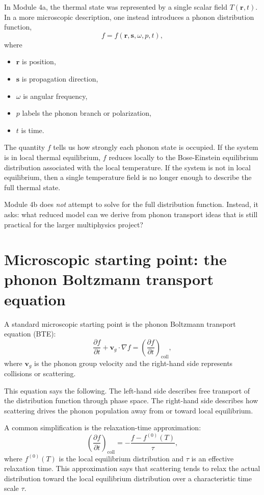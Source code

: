 \documentclass[11pt]{article}
\newcommand{\vvg}{\mathbf{v}_g}
\newcommand{\rvec}{\mathbf{r}}
\begin{document}
In Module 4a, the thermal state was represented by a single scalar field $T(\rvec,t)$. In a more microscopic description, one instead introduces a phonon distribution function,
\begin{equation}
 f = f(\rvec,\mathbf{s},\omega,p,t),
\end{equation}
where
\begin{itemize}
    \item $\rvec$ is position,
    \item $\mathbf{s}$ is propagation direction,
    \item $\omega$ is angular frequency,
    \item $p$ labels the phonon branch or polarization,
    \item $t$ is time.
\end{itemize}

The quantity $f$ tells us how strongly each phonon state is occupied. If the system is in local thermal equilibrium, $f$ reduces locally to the Bose-Einstein equilibrium distribution associated with the local temperature. If the system is not in local equilibrium, then a single temperature field is no longer enough to describe the full thermal state.

Module 4b does \emph{not} attempt to solve for the full distribution function. Instead, it asks: what reduced model can we derive from phonon transport ideas that is still practical for the larger multiphysics project?

\section{Microscopic starting point: the phonon Boltzmann transport equation}

A standard microscopic starting point is the phonon Boltzmann transport equation (BTE):
\begin{equation}
\frac{\partial f}{\partial t} + \vvg\cdot \nabla f = \left(\frac{\partial f}{\partial t}\right)_{\!\mathrm{coll}},
\end{equation}
where $\vvg$ is the phonon group velocity and the right-hand side represents collisions or scattering.

This equation says the following. The left-hand side describes free transport of the distribution function through phase space. The right-hand side describes how scattering drives the phonon population away from or toward local equilibrium.

A common simplification is the relaxation-time approximation:
\begin{equation}
\left(\frac{\partial f}{\partial t}\right)_{\!\mathrm{coll}} = -\frac{f-f^{(0)}(T)}{\tau},
\end{equation}
where $f^{(0)}(T)$ is the local equilibrium distribution and $\tau$ is an effective relaxation time. This approximation says that scattering tends to relax the actual distribution toward the local equilibrium distribution over a characteristic time scale $\tau$.
\end{document}
